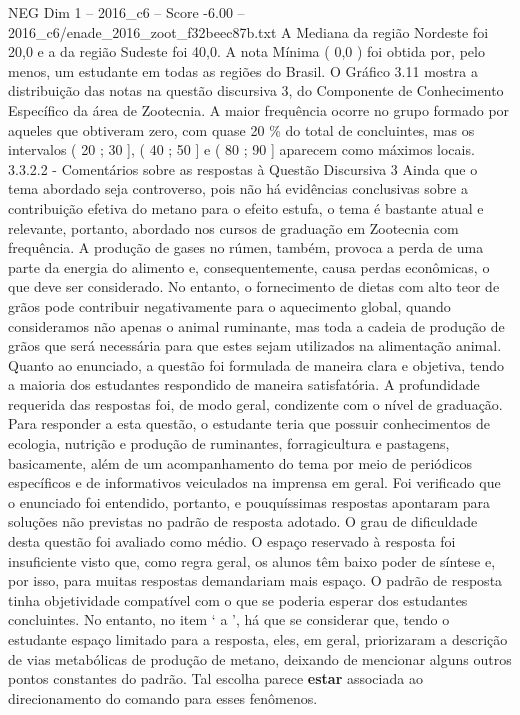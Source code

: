 \begin{textsample}{NEG Dim 1 – 2016\_c6 – Score -6.00 – 2016\_c6/enade\_2016\_zoot\_f32beec87b.txt}
A Mediana da região Nordeste foi 20,0 e a da região Sudeste foi 40,0.
A nota Mínima ( 0,0 ) foi obtida por, pelo menos, um estudante em todas as regiões do Brasil.
O Gráfico 3.11 mostra a distribuição das notas na questão discursiva 3, do Componente de Conhecimento Específico da área de Zootecnia.
A maior frequência ocorre no grupo formado por aqueles que obtiveram zero, com quase 20 \% do total de concluintes, mas os intervalos ( 20 ; 30 ], ( 40 ; 50 ] e ( 80 ; 90 ] aparecem como máximos locais. 3.3.2.2 - Comentários sobre as respostas à Questão Discursiva 3 Ainda que o tema abordado seja controverso, pois não há evidências conclusivas sobre a contribuição efetiva do metano para o efeito estufa, o tema é bastante atual e relevante, portanto, abordado nos cursos de graduação em Zootecnia com frequência.
A produção de gases no rúmen, também, provoca a perda de uma parte da energia do alimento e, consequentemente, causa perdas econômicas, o que deve ser considerado.
No entanto, o fornecimento de dietas com alto teor de grãos pode contribuir negativamente para o aquecimento global, quando consideramos não apenas o animal ruminante, mas toda a cadeia de produção de grãos que será necessária para que estes sejam utilizados na alimentação animal.
Quanto ao enunciado, a questão foi formulada de maneira clara e objetiva, tendo a maioria dos estudantes respondido de maneira satisfatória.
A profundidade requerida das respostas foi, de modo geral, condizente com o nível de graduação.
Para responder a esta questão, o estudante teria que possuir conhecimentos de ecologia, nutrição e produção de ruminantes, forragicultura e pastagens, basicamente, além de um acompanhamento do tema por meio de periódicos específicos e de informativos veiculados na imprensa em geral.
Foi verificado que o enunciado foi entendido, portanto, e pouquíssimas respostas apontaram para soluções não previstas no padrão de resposta adotado.
O grau de dificuldade desta questão foi avaliado como médio.
O espaço reservado à resposta foi insuficiente visto que, como regra geral, os alunos têm baixo poder de síntese e, por isso, para muitas respostas demandariam mais espaço.
O padrão de resposta tinha objetividade compatível com o que se poderia esperar dos estudantes concluintes.
No entanto, no item ‘ a ’, há que se considerar que, tendo o estudante espaço limitado para a resposta, eles, em geral, priorizaram a descrição de vias metabólicas de produção de metano, deixando de mencionar alguns outros pontos constantes do padrão.
Tal escolha parece \textbf{estar} associada ao direcionamento do comando para esses fenômenos.

\end{textsample}
